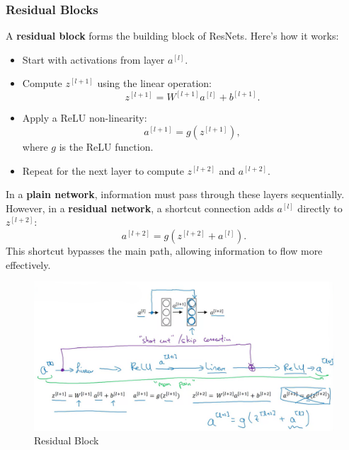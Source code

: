 \documentclass[letterpaper,12pt,notitlepage,twoside]{report}
\begin{document}
\subsubsection{Residual Blocks}
A \textbf{residual block} forms the building block of ResNets. Here's how it works:
\begin{itemize}[nosep]
    \item Start with activations from layer $a^{[l]}$.
    \item Compute $z^{[l+1]}$ using the linear operation:
    \[
    z^{[l+1]} = W^{[l+1]}a^{[l]} + b^{[l+1]}.
    \]
    \item Apply a ReLU non-linearity:
    \[
    a^{[l+1]} = g(z^{[l+1]}),
    \]
    where $g$ is the ReLU function.
    \item Repeat for the next layer to compute $z^{[l+2]}$ and $a^{[l+2]}$.
\end{itemize}
In a \textbf{plain network}, information must pass through these layers sequentially. However, in a \textbf{residual network}, a shortcut connection adds $a^{[l]}$ directly to $z^{[l+2]}$:
\[
a^{[l+2]} = g(z^{[l+2]} + a^{[l]}).
\]
This shortcut bypasses the main path, allowing information to flow more effectively.

\begin{figure}[h]
	\centering
	\includegraphics[width=\textwidth]{Images/Residual Block.png}
	\caption{Residual Block}
	\label{fig:35}
\end{figure}
\end{document}

